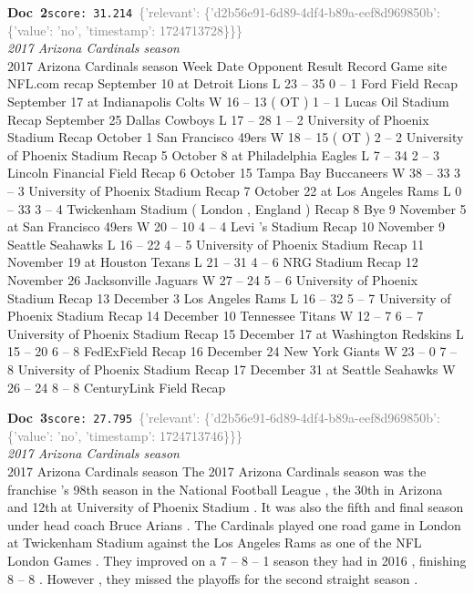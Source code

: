 \documentclass[a4paper,11pt]{article}
\begin{document}
\begin{docenv}
{\footnotesize\textcolor{doccolor}{\textbf{Doc~2}}}\hfill{\tiny\texttt{score:~31.214}}\ {\tiny\textcolor{gray}{\{'relevant': \{'d2b56e91-6d89-4df4-b89a-eef8d969850b': \{'value': 'no', 'timestamp': 1724713728\}\}\}}}\\[3pt]
{\small\textit{2017 Arizona Cardinals season}}\\[2pt]
\vspace{2pt}
{\footnotesize 2017 Arizona Cardinals season
Week Date Opponent Result Record Game site NFL.com recap September 10 at Detroit Lions L 23 -- 35 0 -- 1 Ford Field Recap September 17 at Indianapolis Colts W 16 -- 13 ( OT ) 1 -- 1 Lucas Oil Stadium Recap September 25 Dallas Cowboys L 17 -- 28 1 -- 2 University of Phoenix Stadium Recap October 1 San Francisco 49ers W 18 -- 15 ( OT ) 2 -- 2 University of Phoenix Stadium Recap 5 October 8 at Philadelphia Eagles L 7 -- 34 2 -- 3 Lincoln Financial Field Recap 6 October 15 Tampa Bay Buccaneers W 38 -- 33 3 -- 3 University of Phoenix Stadium Recap 7 October 22 at Los Angeles Rams L 0 -- 33 3 -- 4 Twickenham Stadium ( London , England ) Recap 8 Bye 9 November 5 at San Francisco 49ers W 20 -- 10 4 -- 4 Levi 's Stadium Recap 10 November 9 Seattle Seahawks L 16 -- 22 4 -- 5 University of Phoenix Stadium Recap 11 November 19 at Houston Texans L 21 -- 31 4 -- 6 NRG Stadium Recap 12 November 26 Jacksonville Jaguars W 27 -- 24 5 -- 6 University of Phoenix Stadium Recap 13 December 3 Los Angeles Rams L 16 -- 32 5 -- 7 University of Phoenix Stadium Recap 14 December 10 Tennessee Titans W 12 -- 7 6 -- 7 University of Phoenix Stadium Recap 15 December 17 at Washington Redskins L 15 -- 20 6 -- 8 FedExField Recap 16 December 24 New York Giants W 23 -- 0 7 -- 8 University of Phoenix Stadium Recap 17 December 31 at Seattle Seahawks W 26 -- 24 8 -- 8 CenturyLink Field Recap}
\end{docenv}
\begin{docenv}
{\footnotesize\textcolor{doccolor}{\textbf{Doc~3}}}\hfill{\tiny\texttt{score:~27.795}}\ {\tiny\textcolor{gray}{\{'relevant': \{'d2b56e91-6d89-4df4-b89a-eef8d969850b': \{'value': 'no', 'timestamp': 1724713746\}\}\}}}\\[3pt]
{\small\textit{2017 Arizona Cardinals season}}\\[2pt]
\vspace{2pt}
{\footnotesize 2017 Arizona Cardinals season
The 2017 Arizona Cardinals season was the franchise 's 98th season in the National Football League , the 30th in Arizona and 12th at University of Phoenix Stadium . It was also the fifth and final season under head coach Bruce Arians . The Cardinals played one road game in London at Twickenham Stadium against the Los Angeles Rams as one of the NFL London Games . They improved on a 7 -- 8 -- 1 season they had in 2016 , finishing 8 -- 8 . However , they missed the playoffs for the second straight season .}
\end{docenv}
\end{document}
